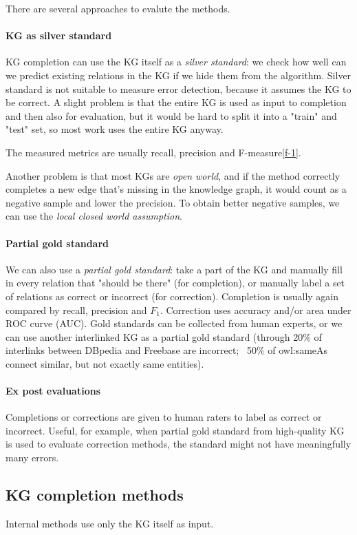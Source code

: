 There are several approaches to evalute the methods.
\paragraph{KG as silver standard}
KG completion can use the KG itself as a \textit{silver standard}: we check how
well can we predict existing relations in the KG if we hide them from the
algorithm. Silver standard is not suitable to measure error detection, because
it assumes the KG to be correct.
A slight problem is that the entire KG is used as input to completion and then
also for evaluation, but it would be hard to split it into a "train" and "test"
set, so most work uses the entire KG anyway.

The measured metrics are usually recall, precision and F-measure\ref{f-1}.

Another problem is that most KGs are \textit{open world}, and if the method
correctly completes a new edge that's missing in the knowledge graph, it would
count as a negative sample and lower the precision. To obtain better negative
samples, we can use the \textit{local closed world assumption}.

\paragraph{Partial gold standard}
We can also use a \textit{partial gold standard}: take a part of the KG and
manually fill in every relation that "should be there" (for completion), or
manually label a set of relations as correct or incorrect (for correction).
Completion is usually again compared by recall, precision and $F_1$.
Correction uses accuracy and/or area under ROC curve (AUC).
Gold standards can be collected from human experts, or we can use another
interlinked KG as a partial gold standard (through 20\% of interlinks between
DBpedia and Freebase are incorrect; ~50\% of owl:sameAs connect similar, but not
exactly same entities).

\paragraph{Ex post evaluations}
Completions or corrections are given to human raters to label as correct or
incorrect. Useful, for example, when partial gold standard from high-quality KG
is used to evaluate correction methods, the standard might not have
meaningfully many errors.

\subsection{KG completion methods}
Internal methods use only the KG itself as input.

